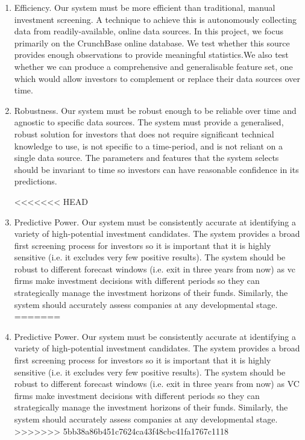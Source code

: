 \documentclass[../thesis/thesis.tex]{subfiles}
\begin{document}
\begin{enumerate}

\item Efficiency. Our system must be more efficient than traditional, manual investment screening. A technique to achieve this is autonomously collecting data from readily-available, online data sources. In this project, we focus primarily on the CrunchBase online database. We test whether this source provides enough observations to provide meaningful statistics.We also test whether we can produce a comprehensive and generalisable feature set, one which would allow investors to complement or replace their data sources over time.

\item Robustness. Our system must be robust enough to be reliable over time and agnostic to specific data sources. The system must provide a generalised, robust solution for investors that does not require significant technical knowledge to use, is not specific to a time-period, and is not reliant on a single data source. The parameters and features that the system selects should be invariant to time so investors can have reasonable confidence in its predictions.

<<<<<<< HEAD
\item Predictive Power. Our system must be consistently accurate at identifying a variety of high-potential investment candidates. The system provides a broad first screening process for investors so it is important that it is highly sensitive (i.e. it excludes very few positive results). The system should be robust to different forecast windows (i.e. exit in three years from now) as \gls{vc} firms make investment decisions with different periods so they can strategically manage the investment horizons of their funds. Similarly, the system should accurately assess companies at any developmental stage.
=======
\item Predictive Power. Our system must be consistently accurate at identifying a variety of high-potential investment candidates. The system provides a broad first screening process for investors so it is important that it is highly sensitive (i.e. it excludes very few positive results). The system should be robust to different forecast windows (i.e. exit in three years from now) as VC firms make investment decisions with different periods so they can strategically manage the investment horizons of their funds. Similarly, the system should accurately assess companies at any developmental stage.
>>>>>>> 5bb38a86b451c7624ca43f48cbc41fa1767c1118

\end{enumerate}
\end{document}

